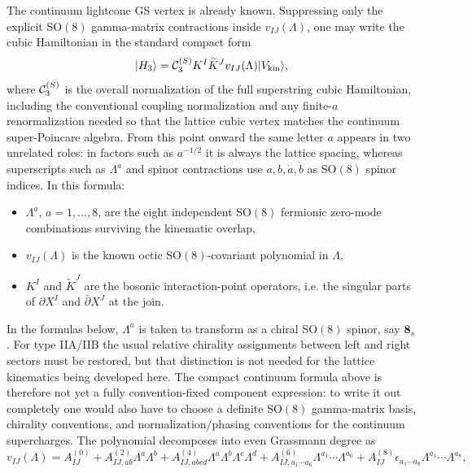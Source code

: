 \documentclass[11pt]{article}
\numberwithin{equation}{section}
\begin{document}
The continuum lightcone GS vertex is already known. Suppressing only the explicit SO$(8)$ gamma-matrix contractions inside $v_{IJ}(\Lambda)$, one may write the cubic Hamiltonian in the standard compact form
\begin{equation}
\label{eq:s14-020}
|H_3\rangle
=
{\cal C}_3^{(S)}
K^I \widetilde K^J v_{IJ}(\Lambda)
|V_{\mathrm{kin}}\rangle,
\end{equation}
where ${\cal C}_3^{(S)}$ is the overall normalization of the full superstring cubic Hamiltonian, including the conventional coupling normalization and any finite-$a$ renormalization needed so that the lattice cubic vertex matches the continuum super-Poincare algebra.
From this point onward the same letter $a$ appears in two unrelated roles: in factors such as $a^{-1/2}$ it is always the lattice spacing, whereas superscripts such as $\Lambda^a$ and spinor contractions use $a,b,\dot a,\dot b$ as SO$(8)$ spinor indices.
In this formula:
\begin{itemize}
\item $\Lambda^a$, $a=1,\dots,8$, are the eight independent SO$(8)$ fermionic zero-mode combinations surviving the kinematic overlap,
\item $v_{IJ}(\Lambda)$ is the known octic SO$(8)$-covariant polynomial in $\Lambda$,
\item $K^I$ and $\widetilde K^J$ are the bosonic interaction-point operators, i.e. the singular parts of $\partial X^I$ and $\bar\partial X^J$ at the join.
\end{itemize}
In the formulas below, $\Lambda^a$ is taken to transform as a chiral SO$(8)$ spinor, say $\mathbf{8}_s$. For type IIA/IIB the usual relative chirality assignments between left and right sectors must be restored, but that distinction is not needed for the lattice kinematics being developed here. The compact continuum formula above is therefore not yet a fully convention-fixed component expression: to write it out completely one would also have to choose a definite SO$(8)$ gamma-matrix basis, chirality conventions, and normalization/phasing conventions for the continuum supercharges.
The polynomial decomposes into even Grassmann degree as
\begin{equation}
\label{eq:s14-021}
v_{IJ}(\Lambda)
=
A^{(0)}_{IJ}
+A^{(2)}_{IJ,ab}\Lambda^a\Lambda^b
+A^{(4)}_{IJ,abcd}\Lambda^a\Lambda^b\Lambda^c\Lambda^d
+A^{(6)}_{IJ,a_1\cdots a_6}\Lambda^{a_1}\cdots\Lambda^{a_6}
+A^{(8)}_{IJ}\epsilon_{a_1\cdots a_8}\Lambda^{a_1}\cdots\Lambda^{a_8},
\end{equation}
\end{document}
